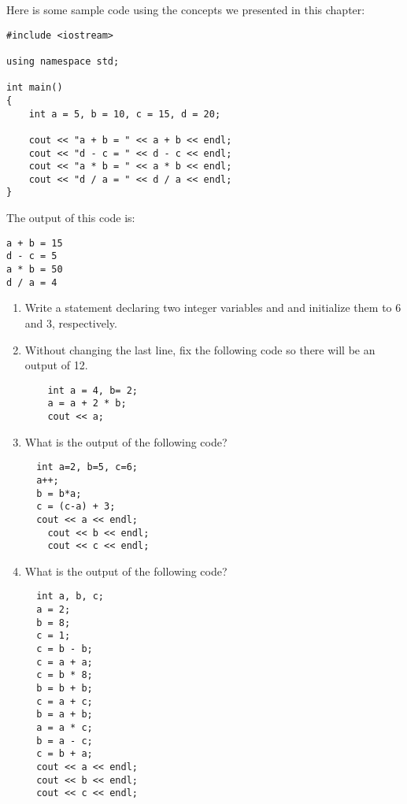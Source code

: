Here is some sample code using the concepts we presented in this chapter:

\begin{lstlisting}
#include <iostream>

using namespace std;

int main()
{
	int a = 5, b = 10, c = 15, d = 20;

	cout << "a + b = " << a + b << endl;
	cout << "d - c = " << d - c << endl;
	cout << "a * b = " << a * b << endl;
	cout << "d / a = " << d / a << endl;
}
\end{lstlisting}

The output of this code is:

\begin{lstlisting}
a + b = 15
d - c = 5
a * b = 50
d / a = 4
\end{lstlisting}


\begin{enumerate}
\item Write a statement declaring two integer variables  and  and initialize them to 6 and 3, respectively. 
\item Without changing the last line, fix the following code so there will be an output of 12.
\begin{lstlisting}
	int a = 4, b= 2;
	a = a + 2 * b;
	cout << a;
\end{lstlisting}

\item What is the output of the following code?
\begin{lstlisting}
  int a=2, b=5, c=6;
  a++;
  b = b*a;
  c = (c-a) + 3;
  cout << a << endl;
	cout << b << endl;
	cout << c << endl;
\end{lstlisting}	
	
\item What is the output of the following code?
\begin{lstlisting}
  int a, b, c;
  a = 2;
  b = 8;
  c = 1;
  c = b - b;
  c = a + a;
  c = b * 8;
  b = b + b;
  c = a + c;
  b = a + b;
  a = a * c;
  b = a - c;
  c = b + a;
  cout << a << endl;
  cout << b << endl;
  cout << c << endl;
\end{lstlisting}
\end{enumerate}

